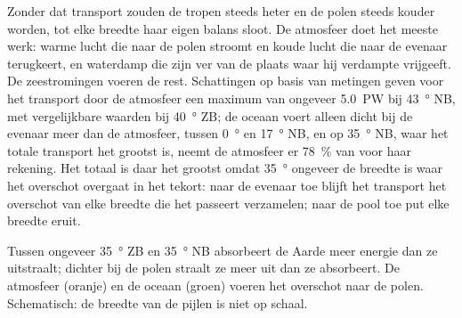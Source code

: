 Zonder dat transport zouden de tropen steeds heter en de polen steeds kouder
worden, tot elke breedte haar eigen balans sloot. De atmosfeer doet het meeste
werk: warme lucht die naar de polen stroomt en koude lucht die naar de evenaar
terugkeert, en waterdamp die zijn  ver van de plaats waar hij
verdampte vrijgeeft. De zeestromingen voeren de rest. Schattingen op basis van
metingen geven voor het transport door de atmosfeer een maximum van ongeveer
\qty{5.0}{PW} bij \qty{43}{\degree} NB, met vergelijkbare waarden bij
\qty{40}{\degree} ZB; de oceaan voert alleen dicht bij de evenaar meer dan de
atmosfeer, tussen \qty{0}{\degree} en \qty{17}{\degree} NB, en op
\qty{35}{\degree} NB, waar het totale transport het grootst is, neemt de
atmosfeer er \qty{78}{\percent} van voor haar rekening. Het totaal is daar het
grootst omdat \qty{35}{\degree} ongeveer de breedte is waar het overschot
overgaat in het tekort: naar de evenaar toe blijft het transport het overschot
van elke breedte die het passeert verzamelen; naar de pool toe put elke breedte
eruit.

\begin{omfigure}

{\small Tussen ongeveer \qty{35}{\degree} ZB en \qty{35}{\degree} NB absorbeert
de Aarde meer energie dan ze uitstraalt; dichter bij de polen straalt ze meer uit
dan ze absorbeert. De atmosfeer (oranje) en de oceaan (groen) voeren het
overschot naar de polen. Schematisch: de breedte van de pijlen is niet op
schaal.}
\end{omfigure}

